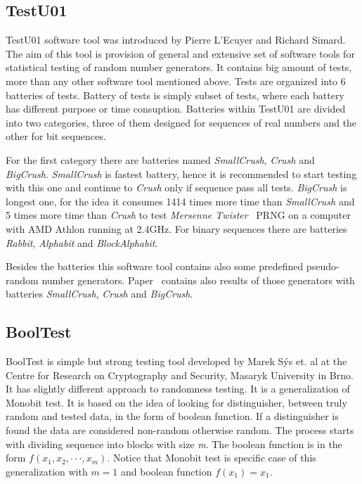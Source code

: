 \documentclass[
    digital,    %
    oneside,    %
    color,
    11pt,
    nocover,
    notable,
    nolof,
    nolot,
    final
]{fithesis3}
\begin{document}
\subsection{TestU01}

TestU01 software tool was introduced by Pierre L'Ecuyer and Richard Simard. The aim of this tool is provision of general and extensive set of software tools for statistical testing of random number generators. It contains big amount of tests, more than any other software tool mentioned above. Tests are organized into 6 batteries of tests. Battery of tests is simply subset of tests, where each battery has different purpose or time consuption. Batteries within TestU01 are divided into two categories, three of them designed for sequences of real numbers and the other for bit sequences. 

For the first category there are batteries named \textit{SmallCrush}, \textit{Crush} and \textit{BigCrush}. \textit{SmallCrush} is fastest battery, hence it is recommended to start testing with this one and continue to \textit{Crush} only if sequence pass all tests. \textit{BigCrush} is longest one, for the idea it consumes 1414 times more time than \textit{SmallCrush} and 5 times more time than \textit{Crush} to test \textit{Mersenne Twister}~\cite{Matsumoto:1998:MTE:272991.272995} PRNG on a computer with AMD Athlon running at 2.4GHz. For binary sequences there are batteries \textit{Rabbit}, \textit{Alphabit} and \textit{BlockAlphabit}. \cite{l2007testu01}

Besides the batteries this software tool contains also some predefined pseudo-random number generators. Paper~\cite{l2007testu01} contains also results of those generators with batteries \textit{SmallCrush}, \textit{Crush} and \textit{BigCrush}.

\subsection{BoolTest}

BoolTest is simple but strong testing tool developed by Marek Sýs et. al at the Centre for Research on Cryptography and Security, Masaryk University in Brno. It has slightly different approach to randomness testing. It is a generalization of Monobit test. It is based on the idea of looking for distinguisher, between truly random and tested data, in the form of boolean function. If a distinguisher is found the data are considered non-random otherwise random. The process starts with dividing sequence into blocks with size \textit{m}. The boolean function is in the form $f(x_{1}, x_{2}, \cdot \cdot \cdot, x_{m})$. Notice that Monobit test is specific case of this generalization with $m = 1$ and boolean function $f(x_{1}) = x_{1}$. 
\end{document}

